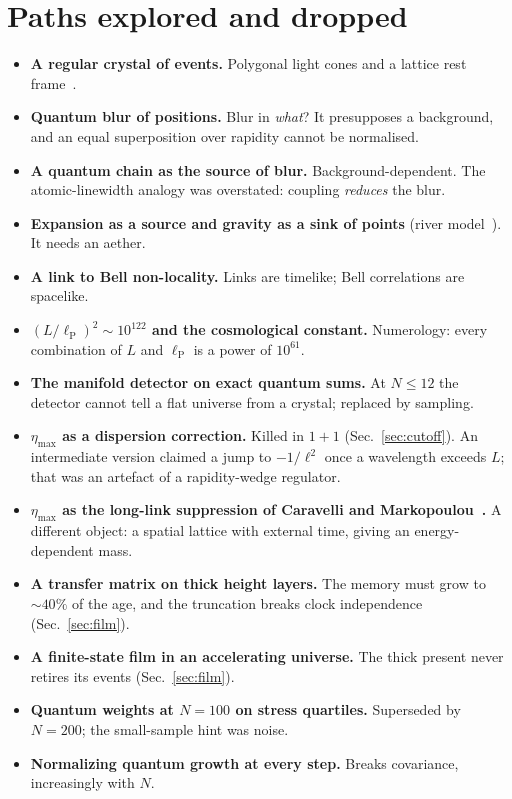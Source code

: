 \documentclass[11pt,a4paper]{article}
\newcommand{\lP}{\ell_{\mathrm P}}
\begin{document}
\appendix
\section{Paths explored and dropped}\label{app:dropped}
\begin{itemize}[leftmargin=*,itemsep=1pt]
\item \textbf{A regular crystal of events.} Polygonal light cones and a lattice rest frame~\cite{Burago,Weyl}.
\item \textbf{Quantum blur of positions.} Blur in \emph{what}? It presupposes a background, and an equal superposition over rapidity cannot be normalised.
\item \textbf{A quantum chain as the source of blur.} Background-dependent. The atomic-linewidth analogy was overstated: coupling \emph{reduces} the blur.
\item \textbf{Expansion as a source and gravity as a sink of points} (river model~\cite{HamiltonLisle08}). It needs an aether.
\item \textbf{A link to Bell non-locality.} Links are timelike; Bell correlations are spacelike.
\item \textbf{$(L/\lP)^2\sim10^{122}$ and the cosmological constant.} Numerology: every combination of $L$ and $\lP$ is a power of $10^{61}$.
\item \textbf{The manifold detector on exact quantum sums.} At $N\le12$ the detector cannot tell a flat universe from a crystal; replaced by sampling.
\item \textbf{$\eta_{\max}$ as a dispersion correction.} Killed in $1+1$ (Sec.~\ref{sec:cutoff}). An intermediate version claimed a jump to $-1/\ell^2$ once a wavelength exceeds $L$; that was an artefact of a rapidity-wedge regulator.
\item \textbf{$\eta_{\max}$ as the long-link suppression of Caravelli and Markopoulou~\cite{CM12}.} A different object: a spatial lattice with external time, giving an energy-dependent mass.
\item \textbf{A transfer matrix on thick height layers.} The memory must grow to $\sim40\%$ of the age, and the truncation breaks clock independence (Sec.~\ref{sec:film}).
\item \textbf{A finite-state film in an accelerating universe.} The thick present never retires its events (Sec.~\ref{sec:film}).
\item \textbf{Quantum weights at $N=100$ on stress quartiles.} Superseded by $N=200$; the small-sample hint was noise.
\item \textbf{Normalizing quantum growth at every step.} Breaks covariance, increasingly with $N$.

\end{itemize}
\end{document}
